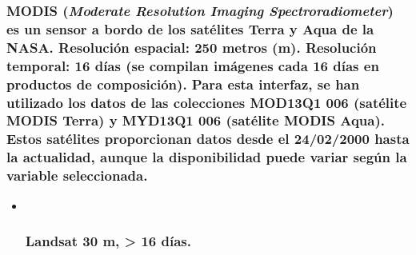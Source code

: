 \documentclass[
]{book}
\begin{document}
\subsubsection{\texorpdfstring{MODIS (\emph{Moderate Resolution Imaging Spectroradiometer}) es un sensor a bordo de los satélites Terra y Aqua de la NASA. \textbf{Resolución espacial:} 250 metros (m). \textbf{Resolución temporal:} 16 días (se compilan imágenes cada 16 días en productos de composición). Para esta interfaz, se han utilizado los datos de las colecciones \textbf{MOD13Q1 006} (satélite MODIS Terra) y \textbf{MYD13Q1 006} (satélite MODIS Aqua). Estos satélites \textbf{proporcionan datos desde} el \textbf{24/02/2000 hasta la actualidad}, aunque la disponibilidad puede variar según la variable seleccionada.}{MODIS (Moderate Resolution Imaging Spectroradiometer) es un sensor a bordo de los satélites Terra y Aqua de la NASA. Resolución espacial: 250 metros (m). Resolución temporal: 16 días (se compilan imágenes cada 16 días en productos de composición). Para esta interfaz, se han utilizado los datos de las colecciones MOD13Q1 006 (satélite MODIS Terra) y MYD13Q1 006 (satélite MODIS Aqua). Estos satélites proporcionan datos desde el 24/02/2000 hasta la actualidad, aunque la disponibilidad puede variar según la variable seleccionada.}}\label{modis-moderate-resolution-imaging-spectroradiometer-es-un-sensor-a-bordo-de-los-satuxe9lites-terra-y-aqua-de-la-nasa.-resoluciuxf3n-espacial-250-metros-m.-resoluciuxf3n-temporal-16-duxedas-se-compilan-imuxe1genes-cada-16-duxedas-en-productos-de-composiciuxf3n.-para-esta-interfaz-se-han-utilizado-los-datos-de-las-colecciones-mod13q1-006-satuxe9lite-modis-terra-y-myd13q1-006-satuxe9lite-modis-aqua.-estos-satuxe9lites-proporcionan-datos-desde-el-24022000-hasta-la-actualidad-aunque-la-disponibilidad-puede-variar-seguxfan-la-variable-seleccionada.}

\begin{itemize}
\item ~
  \subsubsection{\texorpdfstring{\textbf{Landsat 30 m, \textgreater{} 16 días.}}{Landsat 30 m, \textgreater{} 16 días.}}\label{landsat-30-m-16-duxedas.}
\end{itemize}
\end{document}
